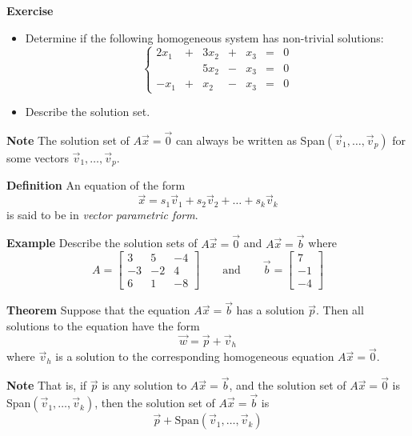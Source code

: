   \begin{frame}[fragile]
\textbf{Exercise}
\begin{itemize}
 \item  Determine if the following homogeneous system has non-trivial solutions: 
\[  \left\{
 \begin{array}{rcrcrcr}
  2x_1 & + & 3x_2 &  + & x_3 & = & 0 \\
       &   & 5x_2 &  - & x_3 & = & 0 \\
  -x_1 & + &  x_2 & -  & x_3 & = & 0 
 \end{array}  \right.
\]   
\item  Describe the solution set.
\end{itemize}

\end{frame}

  \begin{frame}[fragile]
\textbf{Note}
The solution set of $A \vec{x} = \vec{0}$ can always be 
written as Span$(\vec{v}_1, \dots, \vec{v}_p)$ for some vectors 
$\vec{v}_1, \dots, \vec{v}_p$.


\textbf{Definition} 
 An equation of the form 
 \[
  \vec{x} = s_1\vec{v}_1 + s_2 \vec{v}_2 + \dots + s_k \vec{v}_k
 \]
is said to be in {\em vector parametric form}.

\end{frame}

  \begin{frame}[fragile]
\textbf{Example}
Describe the solution sets of $A\vec{x}=\vec{0}$ and  $A \vec{x} = \vec{b}$ where 
\[
 A = \left[\begin{array}{rrr}
      3 &  5 &  -4 \\
     -3 & -2 &   4 \\
      6 &  1  &   -8 
     \end{array}\right]
\qquad  \mbox{and} \qquad
\vec{b} = \left[ \begin{array}{r}
                 7 \\ -1 \\ -4
                \end{array}\right]
\]


\end{frame}

  \begin{frame}[fragile]
\textbf{Theorem} Suppose that the equation $A \vec{x} = \vec{b}$ 
has a solution $\vec{p}$.  Then all solutions to the equation have the 
form 
\[
 \vec{w} = \vec{p } + \vec{v}_h
\]
where $\vec{v}_h$ is a solution to the corresponding homogeneous 
equation $A \vec{x} = \vec{0}$.


\textbf{Note}
That is, if $\vec{p}$ is any solution to $A \vec{x} = \vec{b}$,
and the solution set of $A \vec{x} = \vec{0}$ is 
Span$(\vec{v}_1, \dots , \vec{v}_k)$, then the solution set of 
$A \vec{x} = \vec{b}$ is 
\[ \vec{p} + \mbox{Span}(\vec{v}_1, \dots , \vec{v}_k) \]

\end{frame}

